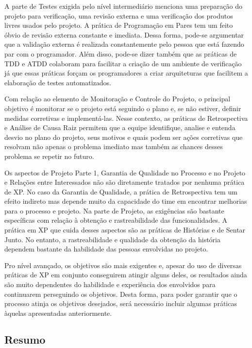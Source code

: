 A parte de Testes exigida pelo nível intermediário menciona uma
preparação do projeto para verificação, uma revisão externa e uma
verificação dos produtos livres usados pelo projeto. A prática de
Programação em Pares tem um feito óbvio de revisão externa constante e
imediata. Dessa forma, pode-se argumentar que a validação externa é
realizada constantemente pelo pessoa que está fazendo par com o
programador. Além disso, pode-se dizer também que as práticas de TDD e
ATDD colaboram para facilitar a criação de um ambiente de verificação
já que essas práticas forçam os programadores a criar arquiteturas que
facilitem a elaboração de testes automatizados.

Com relação ao elemento de Monitoração e Controle do Projeto, o
principal objetivo é monitorar se o projeto está seguindo o plano e,
se não estiver, definir medidas corretivas e implementá-las. Nesse
contexto, as práticas de Retrospectiva e Análise de Causa Raiz
permitem que a equipe identifique, analise e entenda desvio no plano
do projeto, seus motivos e quais podem ser ações corretivas que
resolvam não apenas o problema imediato mas também as chances desses
problema se repetir no futuro.

Os aspectos de Projeto Parte 1, Garantia de Qualidade no Processo e no
Projeto e Relações entre Interessados não são diretamente tratados por
nenhuma prática de XP. No caso da Garantia de Qualidade, a prática de
Retrospectiva tem um efeito indireto mas depende muito da capacidade
do time em encontrar melhorias para o processo e projeto. Na parte de
Projeto, as exigências são bastante específicas com relação à obtenção
e rastreabilidade das funcionalidades. A prática em XP que cuida
desses aspectos são as práticas de Histórias e de Sentar Junto. No
entanto, a rastreabilidade e qualidade da obtenção da história
dependem bastante da habilidade das pessoas envolvidas no projeto.

Pro nível avançado, os objetivos são mais exigentes e, apesar do uso
de diversas práticas de XP em conjunto conseguirem atingir alguns
deles, os resultados ainda são muito dependentes do habilidade e
experiência dos envolvidos para continuarem perseguindo os
objetivos. Desta forma, para poder garantir que o processo atinja os
objetivos desejados, será necessário incluir algumas práticas àquelas
apresentadas anteriormente.

\subsection{Resumo}
\label{sec:resumo-omm}

